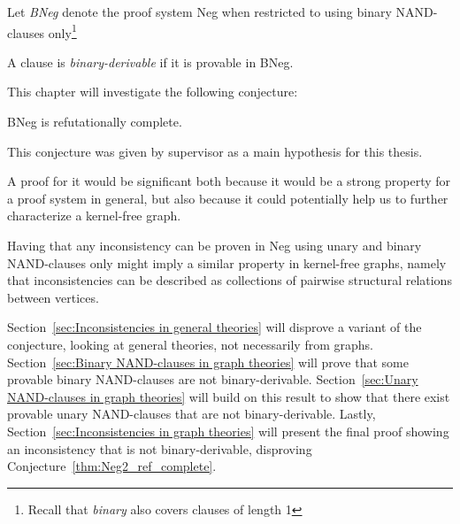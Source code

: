 

\begin{definition}
   Let \textit{BNeg} denote the proof system Neg when restricted to using binary NAND-clauses only\footnote{Recall that \textit{binary} also covers clauses of length 1}
\end{definition}
\begin{definition}
  A clause is \textit{binary-derivable} if it is provable in BNeg.
\end{definition}
This chapter will investigate the following conjecture:
\begin{conjecture}
  BNeg is refutationally complete.
  \label{thm:Neg2_ref_complete}
\end{conjecture}
This conjecture was given by supervisor as a main hypothesis for this thesis.

A proof for it would be significant both because it would be a strong property for a proof system in general, but also because it could potentially help us to further characterize a kernel-free graph.

Having that any inconsistency can be proven in Neg using unary and binary NAND-clauses only might imply a similar property in kernel-free graphs, namely that inconsistencies can be described as collections of pairwise structural relations between vertices.

Section~\ref{sec:Inconsistencies in general theories} will disprove a variant of the conjecture, looking at general theories, not necessarily from graphs.
Section~\ref{sec:Binary NAND-clauses in graph theories} will prove that some provable binary NAND-clauses are not binary-derivable.
Section~\ref{sec:Unary NAND-clauses in graph theories} will build on this result to show that there exist provable unary NAND-clauses that are not binary-derivable.
Lastly, Section~\ref{sec:Inconsistencies in graph theories} will present the final proof showing an inconsistency that is not binary-derivable, disproving Conjecture~\ref{thm:Neg2_ref_complete}.
